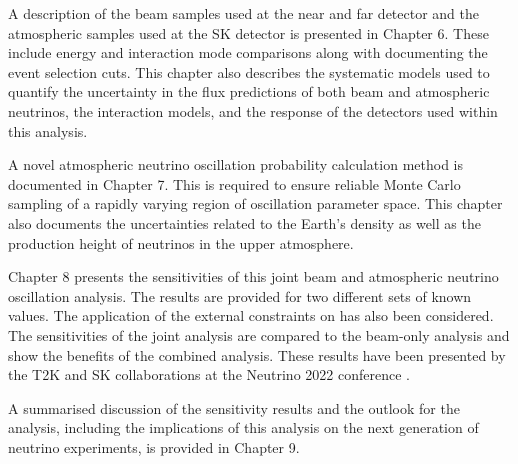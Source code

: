 A description of the beam samples used at the near and far detector and the atmospheric samples used at the SK detector is presented in Chapter 6. These include energy and interaction mode comparisons along with documenting the event selection cuts. This chapter also describes the systematic models used to quantify the uncertainty in the flux predictions of both beam and atmospheric neutrinos, the interaction models, and the response of the detectors used within this analysis.

A novel atmospheric neutrino oscillation probability calculation method is documented in Chapter 7. This is required to ensure reliable Monte Carlo sampling of a rapidly varying region of oscillation parameter space. This chapter also documents the uncertainties related to the Earth's density as well as the production height of neutrinos in the upper atmosphere.

Chapter 8 presents the sensitivities of this joint beam and atmospheric neutrino oscillation analysis.
The results are provided for two different sets of known values. The application of the external constraints on  has also been considered. The sensitivities of the joint analysis are compared to the beam-only analysis and show the benefits of the combined analysis. These results have been presented by the T2K and SK collaborations at the Neutrino 2022 conference \cite{Bronner2022-wd}.

A summarised discussion of the sensitivity results and the outlook for the analysis, including the implications of this analysis on the next generation of neutrino experiments, is provided in Chapter 9.
